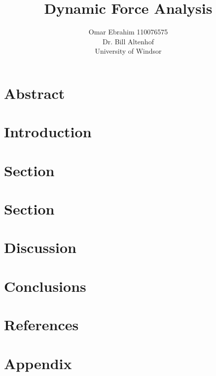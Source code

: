 \documentclass[12pt, titlepage]{article}
\title{Dynamic Force Analysis}
\author{Omar Ebrahim 110076575\\Dr. Bill Altenhof\\ University of Windsor}
\begin{document}
\maketitle
\section*{Abstract}
\newpage
\tableofcontents
\listoffigures
\listoftables
\thispagestyle{tocstyle}
\newpage
\section{Introduction}
\newpage
\section{Section}
\newpage
\section{Section}
\newpage
\section{Discussion}
\newpage
\section{Conclusions}
\newpage
\section{References}
\newpage
\appendix
\section{Appendix}
\end{document}
